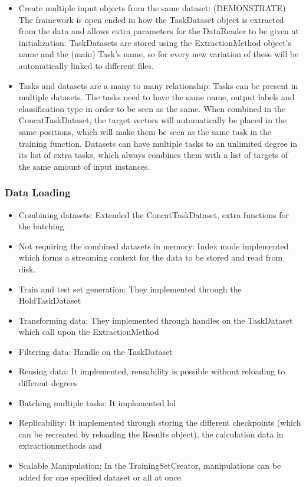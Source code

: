\begin{itemize}
	\item Create multiple input objects from the same dataset: (DEMONSTRATE) The framework is open ended in how the TaskDataset object is extracted from the data and allows extra parameters for the DataReader to be given at initialization. TaskDatasets are stored using the ExtractionMethod object's name and the (main) Task's name, so for every new variation of these will be automatically linked to different files.
	\item Tasks and datasets are a many to many relationship: Tasks can be present in multiple datasets. The tasks need to have the same name, output labels and classification type in order to be seen as the same. When combined in the ConcatTaskDataset, the target vectors will automatically be placed in the same positions, which will make them be seen as the same task in the training function. Datasets can have multiple tasks to an unlimited degree in its list of extra tasks, which always combines them with a list of targets of the same amount of input instances. 
\end{itemize}
\subsubsection{Data Loading}
\begin{itemize}
	\item Combining datasets: Extended the ConcatTaskDataset, extra functions for the batching
	\item Not requiring the combined datasets in memory:  Index mode implemented which forms a streaming context for the data to be stored and read from disk.
	\item Train and test set generation: They implemented through the HoldTaskDataset
	\item Transforming data: They implemented through handles on the TaskDataset which call upon the ExtractionMethod
	\item Filtering data: Handle on the TaskDataset
	\item Reusing data: It implemented, reusability is possible without reloading to different degrees
	\item Batching multiple tasks: It implemented lol
	\item Replicability: It implemented through storing the different checkpoints (which can be recreated by reloading the Results object), the calculation data in extractionmethods and 
	\item Scalable Manipulation: In the TrainingSetCreator, manipulations can be added for one specified dataset or all at once.
\end{itemize}
